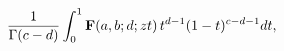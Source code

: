 \[\frac{1}{\mathop{\Gamma\/}\nolimits\!\left(c-d\right)}\int_{0}^{1}\mathop{%
\mathbf{F}\/}\nolimits\!\left(a,b;d;zt\right)t^{d-1}(1-t)^{c-d-1}dt,\]